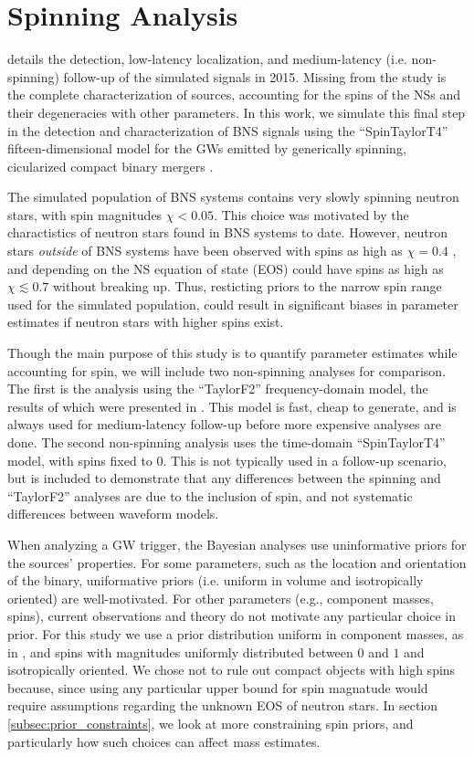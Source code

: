 \section{Spinning Analysis}
\label{sec:spin}

\citet{Singer_2014} details the detection, low-latency localization, and medium-latency (i.e. non-spinning) follow-up of the simulated signals in 2015.  Missing from the study is the complete characterization of sources, accounting for the spins of the NSs and their degeneracies with other parameters.  In this work, we simulate this final step in the detection and characterization of BNS signals using the ``SpinTaylorT4'' fifteen-dimensional model for the GWs emitted by generically spinning, cicularized compact binary mergers \citep{Buonanno_2003,Buonanno_2009}.

The simulated population of BNS systems contains very slowly spinning neutron stars, with spin magnitudes $\chi < 0.05$.  This choice was motivated by the charactistics of neutron stars found in BNS systems to date. However, neutron stars \emph{outside} of BNS systems have been observed with spins as high as $\chi = 0.4$ \citep{Hessels_2006,Brown_2012}, and depending on the NS equation of state (EOS) could have spins as high as $\chi \lesssim 0.7$ \citep{Lo_2011} without breaking up.  Thus, resticting priors to the narrow spin range used for the simulated population, could result in significant biases in parameter estimates if neutron stars with higher spins exist.

Though the main purpose of this study is to quantify parameter estimates while accounting for spin, we will include two non-spinning analyses for comparison.  The first is the analysis using the ``TaylorF2'' frequency-domain model, the results of which were presented in \citet{Singer_2014}.  This model is fast, cheap to generate, and is always used for medium-latency follow-up before more expensive analyses are done.  The second non-spinning analysis uses the time-domain ``SpinTaylorT4'' model, with spins fixed to $0$.  This is not typically used in a follow-up scenario, but is included to demonstrate that any differences between the spinning and ``TaylorF2'' analyses are due to the inclusion of spin, and not systematic differences between waveform models.

When analyzing a GW trigger, the Bayesian analyses use uninformative priors for the sources' properties.  For some parameters, such as the location and orientation of the binary, uniformative priors (i.e. uniform in volume and isotropically oriented) are well-motivated.  For other parameters (e.g., component masses, spins), current observations and theory do not motivate any particular choice in prior.  For this study we use a prior distribution uniform in component masses, as in \citet{2013arXiv1304.0670L}, and spins with magnitudes uniformly distributed between $0$ and $1$ and isotropically oriented.  We chose not to rule out compact objects with high spins because, since using any particular upper bound for spin magnatude would require assumptions regarding the unknown EOS of neutron stars.  In section \ref{subsec:prior_constraints}, we look at more constraining spin priors, and particularly how such choices can affect mass estimates.